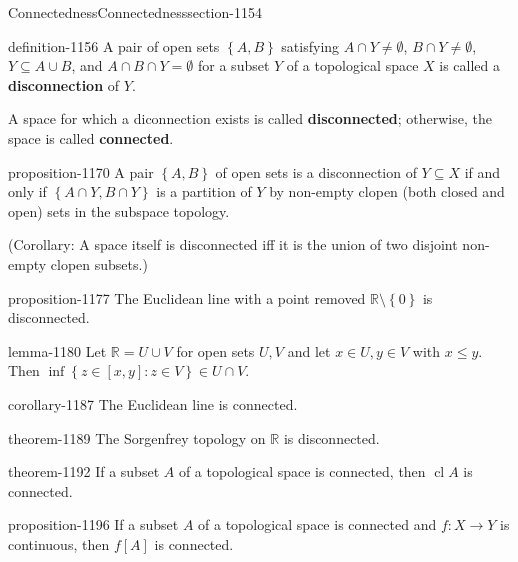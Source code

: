 \documentclass[oneside,10pt,]{article}
\newcommand{\terminology}[1]{\textbf{#1}}
\newcommand{\mb}{\mathbb}
\newcommand{\cl}{\operatorname{cl}}
\newcommand{\setBuilder}[2]{\left\{#1:#2\right\}}
\newcommand{\setList}[1]{\left\{#1\right\}}
\begin{document}
\begin{sectionptx}{Connectedness}{}{Connectedness}{}{}{section-1154}
\begin{definition}{}{definition-1156}%
\hypertarget{p-1157}{}%
A pair of open sets \(\setList{A,B}\) satisfying \(A\cap Y\not=\emptyset\), \(B\cap Y\not=\emptyset\), \(Y\subseteq A\cup B\), and \(A\cap B\cap Y=\emptyset\) for a subset \(Y\) of a topological space \(X\) is called a \terminology{disconnection} of \(Y\).%
\par
\hypertarget{p-1167}{}%
A space for which a diconnection exists is called \terminology{disconnected}; otherwise, the space is called \terminology{connected}.%
\end{definition}
\begin{proposition}{}{}{proposition-1170}%
\hypertarget{p-1171}{}%
A pair \(\setList{A,B}\) of open sets is a disconnection of \(Y\subseteq X\) if and only if \(\setList{A\cap Y,B\cap Y}\) is a partition of \(Y\) by non-empty clopen (both closed and open) sets in the subspace topology.%
\end{proposition}
\hypertarget{p-1176}{}%
(Corollary: A space itself is disconnected iff it is the union of two disjoint non-empty clopen subsets.)%
\begin{proposition}{}{}{proposition-1177}%
\hypertarget{p-1178}{}%
The Euclidean line with a point removed \(\mb R\setminus\setList{0}\) is disconnected.%
\end{proposition}
\begin{lemma}{}{}{lemma-1180}%
\hypertarget{p-1181}{}%
Let \(\mb R=U\cup V\) for open sets \(U,V\) and let \(x\in U,y\in V\) with \(x\leq y\).  Then \(\inf\setBuilder{z\in[x,y]}{z\in V}\in U\cap V\).%
\end{lemma}
\begin{corollary}{}{}{corollary-1187}%
\hypertarget{p-1188}{}%
The Euclidean line is connected.%
\end{corollary}
\begin{theorem}{}{}{theorem-1189}%
\hypertarget{p-1190}{}%
The Sorgenfrey topology on \(\mb R\) is disconnected.%
\end{theorem}
\begin{theorem}{}{}{theorem-1192}%
\hypertarget{p-1193}{}%
If a subset \(A\) of a topological space is connected, then \(\cl A\) is connected.%
\end{theorem}
\begin{proposition}{}{}{proposition-1196}%
\hypertarget{p-1197}{}%
If a subset \(A\) of a topological space is connected and \(f:X\to Y\) is continuous, then \(f[A]\) is connected.%

\end{proposition}
\end{sectionptx}
\end{document}
